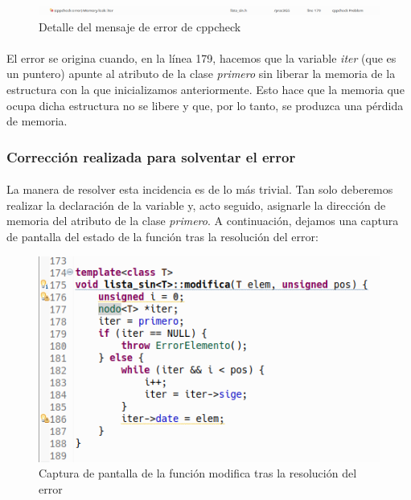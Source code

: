 			\begin{figure}[H]
				\centering
				\includegraphics[scale=0.38]{img/captura43.png}
				\caption{Detalle del mensaje de error de cppcheck}
				\label{captura43}
			\end{figure}
			
			\paragraph{}El error se origina cuando, en la línea 179, hacemos que la variable \textit{iter} (que es un puntero) apunte al atributo de la clase \textit{primero} sin liberar la memoria de la estructura con la que inicializamos anteriormente. Esto hace que la memoria que ocupa dicha estructura no se libere y que, por lo tanto, se produzca una pérdida de memoria. 
		
		\subsubsection{Corrección realizada para solventar el error}
		
			\paragraph{}La manera de resolver esta incidencia es de lo más trivial. Tan solo deberemos realizar la declaración de la variable y, acto seguido, asignarle la dirección de memoria del atributo de la clase \textit{primero}. A continuación, dejamos una captura de pantalla del estado de la función tras la resolución del error:
			
			\begin{figure}[H]
				\centering
				\includegraphics[scale=0.7]{img/captura44.png}
				\caption{Captura de pantalla de la función modifica tras la resolución del error}
				\label{captura44}
			\end{figure}
		
